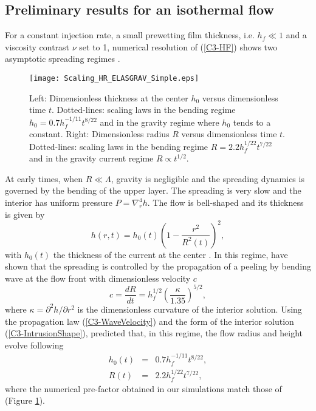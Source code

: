 \subsection{Preliminary results for an isothermal flow}
\label{C3-sec:prel-results-isoth}

For a constant injection rate, a small prewetting film thickness, i.e.
$h_f \ll 1$  and  a  viscosity  contrast   $\nu$  set  to  1,  numerical
resolution  of (\ref{C3-HF})  shows two  asymptotic spreading  regimes
\citep{Michaut:2011kg,Lister:2013ia}.
\begin{figure}[h!]
  \begin{center}
    \graphicspath{ {/Users/thorey/Documents/These/Projet/Refroidissement/Skin_Model/Figure/JFM_V13/} }
    \texttt{[image: Scaling\_HR\_ELASGRAV\_Simple.eps]}
    \caption{Left: Dimensionless thickness at  the center $h_0$ versus
      dimensionless  time  $t$.   Dotted-lines: scaling  laws  in  the
      bending regime $h_0= 0.7h_f^{-1/11}t^{8/22}$  and in the gravity
      regime where  $h_0$ tends  to a constant.   Right: Dimensionless
      radius $R$ versus dimensionless time $t$.  Dotted-lines: scaling
      laws in the bending regime $R= 2.2h_f^{1/22}t^{7/22}$ and in the
      gravity current regime $R\propto t^{1/2}$.}
    \label{C3-Scaling_HR_ELASGRAV_Simple}
  \end{center}
\end{figure}

At  early times,  when $R \ll \Lambda$,  gravity is  negligible and  the
spreading dynamics is governed by the bending of the upper layer.  The
spreading  is  very  slow  and   the  interior  has  uniform  pressure
$P =\nabla_r^4h$.  The flow is  bell-shaped and its thickness is given
by
\begin{equation}
  h(r,t) = h_0(t)\left(1-\frac{r^2}{R^2(t)}\right)^2,
  \label{C3-IntrusionShape}
\end{equation}
with   $h_0(t)$  the   thickness  of   the  current   at  the   center
\citep{Michaut:2011kg,Lister:2013ia}.       In       this      regime,
\citet{Lister:2013ia} have  shown that the spreading  is controlled by
the propagation  of a peeling by  bending wave at the  flow front with
dimensionless velocity $c$
\begin{equation}
  c=    \frac{d             R}{d            t}             =h_f^{1/2}
  \left(\frac{\kappa}{1.35}\right)^{5/2},
  \label{C3-WaveVelocity}
\end{equation}
where  $\kappa  =  \partial^2  h/\partial r^2$  is  the  dimensionless
curvature  of  the  interior  solution.   Using  the  propagation  law
(\ref{C3-WaveVelocity})  and   the  form  of  the   interior  solution
(\ref{C3-IntrusionShape}),  \citet{Lister:2013ia}  predicted that,  in
this regime, the flow radius and height evolve following
\begin{eqnarray}
  h_0(t)&=& 0.7 h_f^{-1/11}t^{8/22}\label{C3-ScalingH},\\
  R(t) &=& 2.2h_f^{1/22}t^{7/22}\label{C3-ScalingR},
\end{eqnarray}
where the numerical pre-factor obtained in our simulations match those
of \citet{Lister:2013ia} (Figure \ref{C3-Scaling_HR_ELASGRAV_Simple}).

